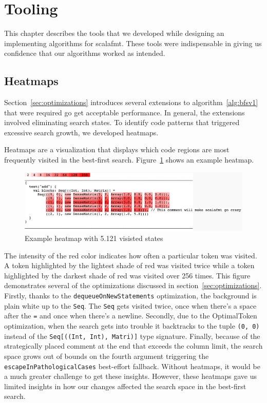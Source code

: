 \section{Tooling}\label{sec:tooling}
This chapter describes the tools that we developed while designing an implementing algorithms for scalafmt.
These tools were indispensable in giving us confidence that our algorithms worked as intended.

\subsection{Heatmaps}
Section~\ref{sec:optimizations} introduces several extensions to algorithm~\ref{alg:bfsv1} that were required go get acceptable performance.
In general, the extensions involved eliminating search states.
To identify code patterns that triggered excessive search growth, we developed heatmaps.

Heatmaps are a visualization that displays which code regions are most frequently visited in the best-first search.
Figure~\ref{fig:heatmap} shows an example heatmap.
\begin{figure}
  \centering
  \includegraphics[width=\textwidth]{img/heatmap.png}
  \caption{Example heatmap with 5.121 visisted states}
  \label{fig:heatmap}
\end{figure}
The intensity of the red color indicates how often a particular token was visited.
A token highlighted by the lightest shade of red was visited twice while a token highlighted by the darkest shade of red was visited over 256 times.
This figure demonstrates several of the optimizations discussed in section~\ref{sec:optimizations}.
Firstly, thanks to the \texttt{dequeueOnNewStatements} optimization, the background is plain white up to the \texttt{Seq}.
The \texttt{Seq} gets visited twice, once when there's a space after the \texttt{=} and once when there's a newline.
Secondly, due to the OptimalToken optimization, when the search gets into trouble it backtracks to the tuple \texttt{(0, 0)} instead of the \texttt{Seq[((Int, Int), Matri)]} type signature.
Finally, because of the strategically placed comment at the end that exceeds the column limit, the search space grows out of bounds on the fourth argument triggering the \texttt{escapeInPathologicalCases} best-effort fallback.
Without heatmaps, it would be a much greater challenge to get these insights.
However, these heatmaps gave us limited insights in how our changes affected the search space in the best-first search.

